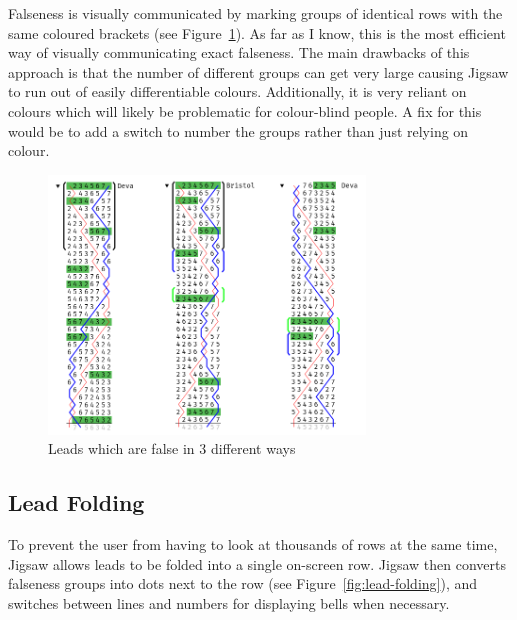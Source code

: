\documentclass[12pt]{article}
\begin{document}
Falseness is visually communicated by marking groups of identical rows with the same coloured
brackets (see Figure~\ref{fig:falseness}).  As far as I know, this is the most efficient way of
visually communicating exact falseness.  The main drawbacks of this approach is that the number of
different groups can get very large causing Jigsaw to run out of easily differentiable colours.
Additionally, it is very reliant on colours which will likely be problematic for colour-blind
people.  A fix for this would be to add a switch to number the groups rather than just relying on
colour.

\begin{figure}
    \centering
    \includegraphics[width=0.75\textwidth]{falseness-clean}
    \caption{Leads which are false in 3 different ways}\label{fig:falseness}
\end{figure}

\subsection{Lead Folding}

To prevent the user from having to look at thousands of rows at the same time, Jigsaw allows leads
to be folded into a single on-screen row.  Jigsaw then converts falseness groups into dots next to the row
(see Figure~\ref{fig:lead-folding}), and switches between lines and numbers for displaying
bells when necessary.
\end{document}
